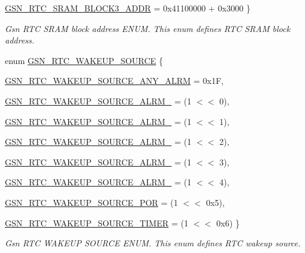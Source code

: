 \begin{DoxyCompactItemize}
\par
\hyperlink{a00651_ggaec3839be6e64287f1c0981aafc08548ba6a983ff757cfc02c7840260c15197f91}{GSN\_\-RTC\_\-SRAM\_\-BLOCK3\_\-ADDR} =  0x41100000 + 0x3000
 \}
\begin{DoxyCompactList}\small\item\em Gsn RTC SRAM block address ENUM. This enum defines RTC SRAM block address. \end{DoxyCompactList}\item 
enum \hyperlink{a00651_gae287d9e78906e2c47d820fbde51a862e}{GSN\_\-RTC\_\-WAKEUP\_\-SOURCE} \{ \par
\hyperlink{a00651_ggae287d9e78906e2c47d820fbde51a862eafcbc2880dd529fe46dcbf1d7869ad389}{GSN\_\-RTC\_\-WAKEUP\_\-SOURCE\_\-ANY\_\-ALRM} =  0x1F, 
\par
\hyperlink{a00651_ggae287d9e78906e2c47d820fbde51a862ea693f6f3681d8eaf9cac688c9ba3e2d21}{GSN\_\-RTC\_\-WAKEUP\_\-SOURCE\_\-ALRM\_} =  (1 $<$$<$ 0), 
\par
\hyperlink{a00651_ggae287d9e78906e2c47d820fbde51a862eaade77c053e65f4fd35cb3df984d09c86}{GSN\_\-RTC\_\-WAKEUP\_\-SOURCE\_\-ALRM\_} =  (1 $<$$<$ 1), 
\par
\hyperlink{a00651_ggae287d9e78906e2c47d820fbde51a862ea62248bb900330f84d559f46e186eca45}{GSN\_\-RTC\_\-WAKEUP\_\-SOURCE\_\-ALRM\_} =  (1 $<$$<$ 2), 
\par
\hyperlink{a00651_ggae287d9e78906e2c47d820fbde51a862ea61615cc6fccf9780e9bc48cbd1e83a0b}{GSN\_\-RTC\_\-WAKEUP\_\-SOURCE\_\-ALRM\_} =  (1 $<$$<$ 3), 
\par
\hyperlink{a00651_ggae287d9e78906e2c47d820fbde51a862eabba5a79a5565593894719cc5bb2aa51e}{GSN\_\-RTC\_\-WAKEUP\_\-SOURCE\_\-ALRM\_} =  (1 $<$$<$ 4), 
\par
\hyperlink{a00651_ggae287d9e78906e2c47d820fbde51a862ea3bd6daf06f67ddb4e61b18d1b7005c17}{GSN\_\-RTC\_\-WAKEUP\_\-SOURCE\_\-POR} =  (1 $<$$<$ 0x5), 
\par
\hyperlink{a00651_ggae287d9e78906e2c47d820fbde51a862eab31ebe3924b7427e49f2cfd644822a1f}{GSN\_\-RTC\_\-WAKEUP\_\-SOURCE\_\-TIMER} =  (1 $<$$<$ 0x6)
 \}
\begin{DoxyCompactList}\small\item\em Gsn RTC WAKEUP SOURCE ENUM. This enum defines RTC wakeup source. \end{DoxyCompactList}\end{DoxyCompactItemize}
